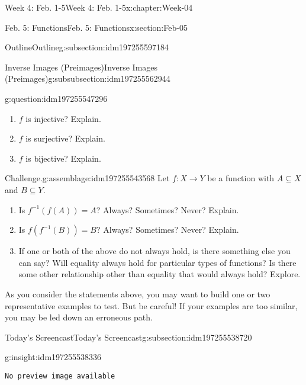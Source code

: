 \documentclass[oneside,10pt,]{book}
\newcommand{\mono}[1]{\texttt{#1}}
\numberwithin{equation}{section}
\newlength{\qrsize}
\newlength{\previewwidth}
\begin{document}
\begin{chapterptx}{Week 4: Feb. 1-5}{}{Week 4: Feb. 1-5}{}{}{x:chapter:Week-04}
\begin{sectionptx}{Feb. 5: Functions}{}{Feb. 5: Functions}{}{}{x:section:Feb-05}
\begin{subsectionptx}{Outline}{}{Outline}{}{}{g:subsection:idm197255597184}
\begin{subsubsectionptx}{Inverse Images (Preimages)}{}{Inverse Images (Preimages)}{}{}{g:subsubsection:idm197255562944}
\begin{question}{}{g:question:idm197255547296}
\begin{enumerate}
\item{}\(f\) is injective? Explain.%
\item{}\(f\) is surjective? Explain.%
\item{}\(f\) is bijective? Explain.%
\end{enumerate}
\end{question}
\begin{assemblage}{Challenge.}{g:assemblage:idm197255543568}%
Let \(f: X\to Y\) be a function with \(A\subseteq X\) and \(B\subseteq Y\). %
\begin{enumerate}
\item{}Is \(f^{-1}(f(A))=A\)? Always? Sometimes? Never? Explain.%
\item{}Is \(f(f^{-1}(B)) = B\)? Always? Sometimes? Never? Explain.%
\item{}If one or both of the above do not always hold, is there something else you can say? Will equality always hold for particular types of functions? Is there some other relationship other than equality that would always hold? Explore.%
\end{enumerate}
 As you consider the statements above, you may want to build one or two representative examples to test. But be careful! If your examples are too similar, you may be led down an erroneous path.%
\end{assemblage}
\end{subsubsectionptx}
\end{subsectionptx}
%
%
\typeout{************************************************}
\typeout{************************************************}
%
\begin{subsectionptx}{Today's Screencast}{}{Today's Screencast}{}{}{g:subsection:idm197255538720}
\begin{insight}{}{g:insight:idm197255538336}%
\setlength{\qrsize}{9em}
\setlength{\previewwidth}{\linewidth}
\addtolength{\previewwidth}{-\qrsize}
\begin{tcbraster}[raster columns=2, raster column skip=1pt, raster halign=center, raster force size=false, raster left skip=0pt, raster right skip=0pt]%
\begin{tcolorbox}[previewstyle, width=\previewwidth]%
\mono{No preview image available}%
\end{tcolorbox}%
\begin{tcolorbox}[qrstyle]%
[QR LINK]\end{tcolorbox}%
\end{tcbraster}%
\end{insight}

\end{subsectionptx}
\end{sectionptx}
\end{chapterptx}
\end{document}
